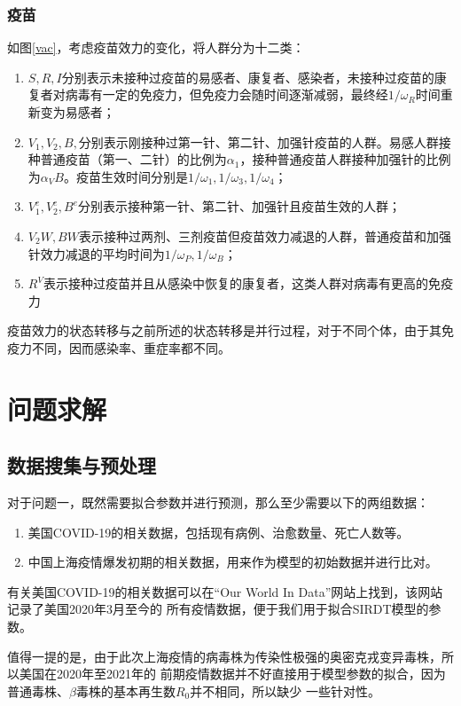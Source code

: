 \documentclass[bwprint]{gmcmthesis}
\numberwithin{figure}{section}
\begin{document}
\subsubsection{疫苗}
\par 如图\ref{vac}，考虑疫苗效力的变化，将人群分为十二类：
\begin{enumerate}
\item $S,R,I$分别表示未接种过疫苗的易感者、康复者、感染者，未接种过疫苗的康复者对病毒有一定的免疫力，但免疫力会随时间逐渐减弱，最终经$1/\omega_R$时间重新变为易感者；
\item $V_1,V_2,B,$分别表示刚接种过第一针、第二针、加强针疫苗的人群。易感人群接种普通疫苗（第一、二针）的比例为$\alpha _{1}$，接种普通疫苗人群接种加强针的比例为$\alpha_VB$。疫苗生效时间分别是$1/\omega_1,1/\omega_3,1/\omega_4$；
\item $V_1^e,V_2^e,B^e$分别表示接种第一针、第二针、加强针且疫苗生效的人群；
\item $V_2W,BW$表示接种过两剂、三剂疫苗但疫苗效力减退的人群，普通疫苗和加强针效力减退的平均时间为$1/\omega_P,1/\omega_B$；
\item $R^V$表示接种过疫苗并且从感染中恢复的康复者，这类人群对病毒有更高的免疫力
\end{enumerate}
\par 疫苗效力的状态转移与之前所述的状态转移是并行过程，对于不同个体，由于其免疫力不同，因而感染率、重症率都不同。

\section{问题求解}
\subsection{数据搜集与预处理}
\par 对于问题一，既然需要拟合参数并进行预测，那么至少需要以下的两组数据：

\begin{enumerate}
    \item 美国COVID-19的相关数据，包括现有病例、治愈数量、死亡人数等。
    \item 中国上海疫情爆发初期的相关数据，用来作为模型的初始数据并进行比对。
\end{enumerate}

\par 有关美国COVID-19的相关数据可以在“Our World In Data”网站上找到，该网站记录了美国2020年3月至今的
所有疫情数据，便于我们用于拟合SIRDT模型的参数。

\par 值得一提的是，由于此次上海疫情的病毒株为传染性极强的奥密克戎变异毒株，所以美国在2020年至2021年的
前期疫情数据并不好直接用于模型参数的拟合，因为普通毒株、$\beta$毒株的基本再生数$R_0$并不相同，所以缺少
一些针对性。
\end{document}
